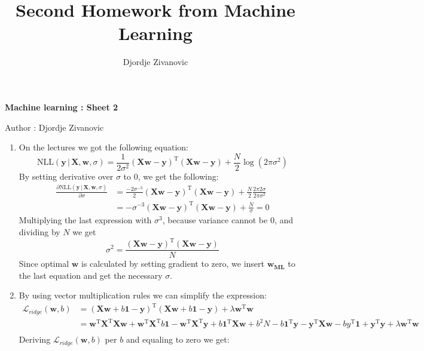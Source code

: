 \documentclass[10pt,a4paper]{article}
\author{Djordje Zivanovic}
\title{Second Homework from Machine Learning}
\begin{document}
\centerline{\large \bf Machine learning : Sheet 2}
\centerline{\large Author : Djordje Zivanovic}
\bigskip
\newcommand{\transpose}[1]{#1 ^ \text{T}}
\newcommand{\expectation}{\underset{\mathcal{D}}{\mathbb{E}}}

\begin{enumerate}
\item
On the lectures we got the following equation:
$$\text{NLL}(\textbf{y}\,\vert\,\textbf{X}, \textbf{w}, \sigma)= \frac{1}{2\sigma^2}(\textbf{Xw} - \textbf{y})^\text{T}(\textbf{Xw} - \textbf{y}) + \frac{N}{2}\log(2\pi\sigma^2)$$
By setting derivative over $\sigma$ to 0, we get the following:
\begin{align*}
\frac{\partial \text{NLL}(\textbf{y}\,\vert\,\textbf{X}, \textbf{w}, \sigma)}{\partial \sigma} &= \frac{-2\sigma^{-3}}{2} (\textbf{Xw} - \textbf{y})^\text{T}(\textbf{Xw} - \textbf{y}) + 
\frac{N}{2}\frac{2\pi 2\sigma}{2\pi\sigma^2}\\
&= -\sigma^{-3} (\textbf{Xw} - \textbf{y})^\text{T}(\textbf{Xw} - \textbf{y}) + \frac{N}{\sigma} = 0
\end{align*}
Multiplying the last expression with $\sigma^3$, because variance cannot be 0, and dividing by $N$ we get $$\sigma^2 =\frac{(\textbf{Xw} - \textbf{y})^\text{T}(\textbf{Xw} - \textbf{y})}{N} $$
Since optimal $\textbf{w}$ is calculated by setting gradient to zero, we insert $\textbf{w}_{\textbf{ML}}$ to the last equation and get the necessary $\sigma$.
\item By using vector multiplication rules we can simplify the expression:
\begin{align*}
\mathcal{L}_{ridge}(\textbf{w},b) 
&= \transpose{(\textbf{Xw}+b\textbf{1}-\textbf{y})}(\textbf{Xw}+b\textbf{1}-\textbf{y})+\lambda \transpose{\textbf{w}}\textbf{w}\\
&= \transpose{\textbf{w}}\transpose{\textbf{X}}\textbf{Xw} + \transpose{\textbf{w}}\transpose{\textbf{X}}b\textbf{1}-\transpose{\textbf{w}}\transpose{\textbf{X}}\textbf{y}+b\transpose{\textbf{1}}\textbf{X}\textbf{w} + b^2N -b\transpose{\textbf{1}}\textbf{y} - \transpose{\textbf{y}}\textbf{Xw}-b\transpose{y}\textbf{1} + \transpose{\textbf{y}} \textbf{y} + \lambda \transpose{\textbf{w}}\textbf{w}\\
\end{align*}
Deriving $\mathcal{L}_{ridge}(\textbf{w},b) $ per $b$ and equaling to zero we get:
\begin{align*}

\end{align*}
\end{enumerate}
\end{document}
